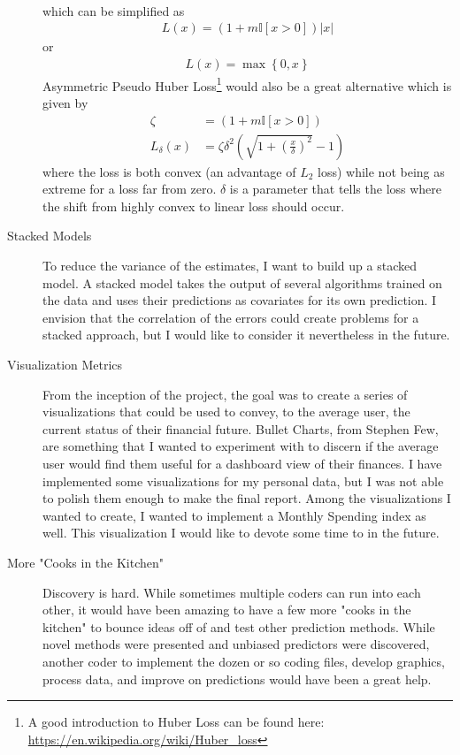 \documentclass[11pt,a4paper]{article}
\begin{document}
\begin{description}
\begin{align*}
	\end{align*} which can be simplified as 
	\begin{align*}
	L(x) = \left(1 + m\mathbb{I}\left[x > 0\right]\right)\left|x\right|
	\end{align*} or 
	\begin{align*}
	L(x) = \max\left\lbrace 0, x \right\rbrace
	\end{align*} Asymmetric Pseudo Huber Loss\footnote{A good introduction to Huber Loss can be found here: \url{https://en.wikipedia.org/wiki/Huber_loss}} would also be a great alternative which is given by
	\begin{align*}
	\zeta &=  \left(1 + m\mathbb{I}\left[x > 0\right]\right) \\
	L_\delta(x) &= \zeta \delta^2 \left(\sqrt{1 + \left(\frac{x}{\delta}\right)^2} - 1\right)
	\end{align*}
	where the loss is both convex (an advantage of $ L_2 $ loss) while not being as extreme for a loss far from zero. $ \delta $ is a parameter that tells the loss where the shift from highly convex to linear loss should occur.
	\item[Stacked Models] To reduce the variance of the estimates, I want to build up a stacked model. A stacked model takes the output of several algorithms trained on the data and uses their predictions as covariates for its own prediction. I envision that the correlation of the errors could create problems for a stacked approach, but I would like to consider it nevertheless in the future.  
	\item[Visualization Metrics] From the inception of the project, the goal was to create a series of visualizations that could be used to convey, to the average user, the current status of their financial future. Bullet Charts, from Stephen Few, are something that I wanted to experiment with to discern if the average user would find them useful for a dashboard view of their finances. I have implemented some visualizations for my personal data, but I was not able to polish them enough to make the final report. Among the visualizations I wanted to create, I wanted to implement a Monthly Spending index as well. This visualization I would like to devote some time to in the future. 
	\item[More "Cooks in the Kitchen"] Discovery is hard. While sometimes multiple coders can run into each other, it would have been amazing to have a few more "cooks in the kitchen" to bounce ideas off of and test other prediction methods. While novel methods were presented and unbiased predictors were discovered, another coder to implement the dozen or so coding files, develop graphics, process data, and improve on predictions would have been a great help. 
\end{description}
\end{document}
